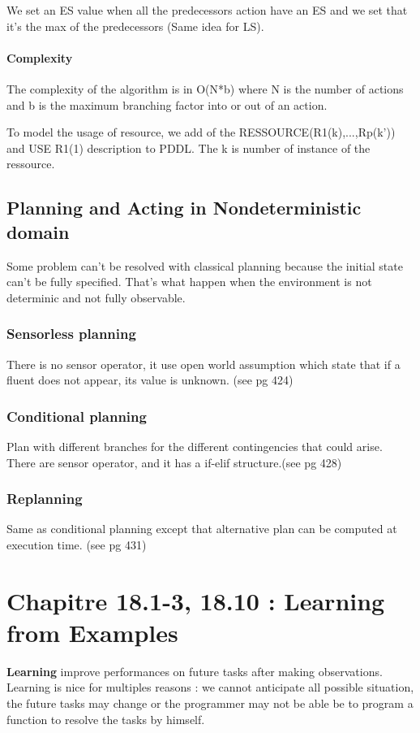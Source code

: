 We set an ES  value when all the predecessors action have  an ES and we 
set that it's the max of the predecessors (Same idea for LS).           

\paragraph{Complexity}  The complexity  of  the algorithm  is in  O(N*b)
where N is the  number of actions and b is  the maximum branching factor
into or out  of an action.

To  model the usage of resource,  we add of
the RESSOURCE(R1(k),...,Rp(k')) and USE R1(1) description to PDDL. The k
is number of instance of the ressource.

\subsection{Planning and Acting in Nondeterministic domain}
Some  problem can't  be  resolved with  classical  planning because  the
initial state  can't be fully specified.  That's what happen when the
environment is not determinic and not fully observable.

\subsubsection{Sensorless planning}
There is  no sensor operator, it  use open world assumption  which state
that if  a fluent does  not appear, its value  is unknown. (see  pg 424)

\subsubsection{Conditional planning}
Plan with different branches for  the different contingencies that could
arise. There are sensor operator, and it has a if-elif structure.(see pg
428)

\subsubsection{Replanning}
Same  as  conditional  planning  except that  alternative  plan  can  be
computed at execution time. (see pg 431)

\section{Chapitre 18.1-3, 18.10 : Learning from Examples }
\textbf{Learning} improve performances on future tasks after making observations. Learning is nice for multiples reasons : we cannot anticipate
all possible situation, the future tasks may change or the programmer may not be able be to program a function to resolve the tasks by himself.

